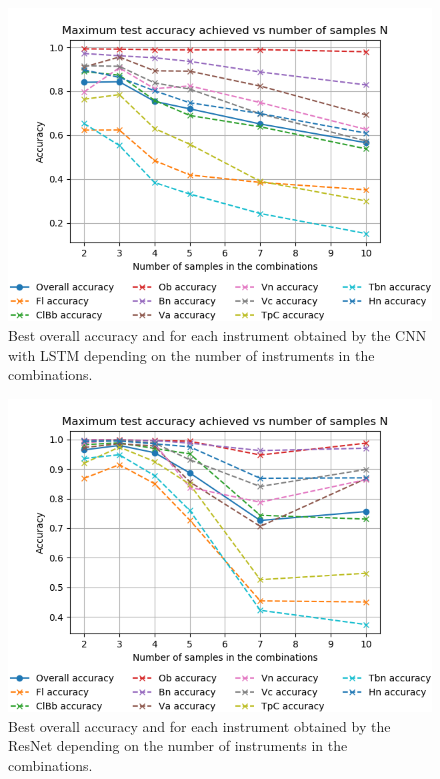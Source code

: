 \documentclass{article}
\begin{document}
\begin{figure}
\includegraphics[scale=0.5]{figs/Acc_vs_N_CNN.png}
\caption{Best overall accuracy and for each instrument obtained by the CNN with LSTM depending on the number of instruments in the combinations. \label{best_acc_cnn}}
\end{figure}

\begin{figure}
\includegraphics[scale=0.5]{figs/Acc_vs_N_ResNet.png}
\caption{Best overall accuracy and for each instrument obtained by the ResNet depending on the number of instruments in the combinations. \label{best_acc_resnet}}
\end{figure}
\end{document}
